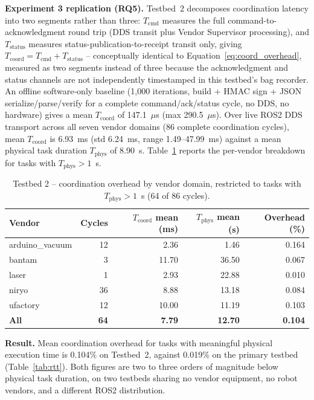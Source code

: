 \documentclass[a4paper,fleqn]{cas-dc}
\begin{document}
\textbf{Experiment 3 replication (RQ5).} Testbed~2 decomposes coordination latency into two segments rather than three: $T_{\text{cmd}}$ measures the full command-to-acknowledgment round trip (DDS transit plus Vendor Supervisor processing), and $T_{\text{status}}$ measures status-publication-to-receipt transit only, giving $T_{\text{coord}} = T_{\text{cmd}} + T_{\text{status}}$ -- conceptually identical to Equation~\ref{eq:coord_overhead}, measured as two segments instead of three because the acknowledgment and status channels are not independently timestamped in this testbed's bag recorder. An offline software-only baseline (1,000 iterations, build + HMAC sign + JSON serialize/parse/verify for a complete command/ack/status cycle, no DDS, no hardware) gives a mean $T_{\text{coord}}$ of 147.1~$\mu$s (max 290.5~$\mu$s). Over live ROS2 DDS transport across all seven vendor domains (86 complete coordination cycles), mean $T_{\text{coord}}$ is 6.93~ms (std 6.24~ms, range 1.49--47.99~ms) against a mean physical task duration $T_{\text{phys}}$ of 8.90~s. Table~\ref{tab:testbed2_overhead} reports the per-vendor breakdown for tasks with $T_{\text{phys}} > 1$~s.

\begin{table}[h]
\centering
\caption{Testbed 2 -- coordination overhead by vendor domain, restricted to tasks with $T_{\text{phys}} > 1$~s (64 of 86 cycles).}
\label{tab:testbed2_overhead}
\begin{tabular}{lrrrr}
\toprule
\textbf{Vendor} & \textbf{Cycles} & \textbf{$T_{\text{coord}}$ mean (ms)} & \textbf{$T_{\text{phys}}$ mean (s)} & \textbf{Overhead (\%)} \\
\midrule
arduino\_vacuum & 12 &  2.36 &  1.46 & 0.164 \\
bantam          &  3 & 11.70 & 36.50 & 0.067 \\
laser           &  1 &  2.93 & 22.88 & 0.010 \\
niryo           & 36 &  8.88 & 13.18 & 0.084 \\
ufactory        & 12 & 10.00 & 11.19 & 0.103 \\
\midrule
\textbf{All}    & \textbf{64} & \textbf{7.79} & \textbf{12.70} & \textbf{0.104} \\
\bottomrule
\end{tabular}
\end{table}

\textbf{Result.} Mean coordination overhead for tasks with meaningful physical execution time is 0.104\% on Testbed~2, against 0.019\% on the primary testbed (Table~\ref{tab:rtt}). Both figures are two to three orders of magnitude below physical task duration, on two testbeds sharing no vendor equipment, no robot vendors, and a different ROS2 distribution.
\end{document}
